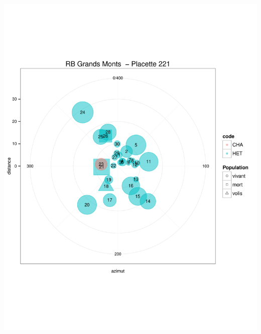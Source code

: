 \documentclass[a4paper]{book}\usepackage[]{graphicx}\usepackage[]{color}
\makeatletter
\def\maxwidth{ %
  \ifdim\Gin@nat@width>\linewidth
    \linewidth
  \else
    \Gin@nat@width
  \fi
}
\newenvironment{knitrout}{}{} %
\makeatother
\begin{document}
\begin{knitrout}
{\centering \includegraphics[width=\maxwidth]{Figures/PlanArbres-22} 

}





\end{knitrout}
\end{document}

